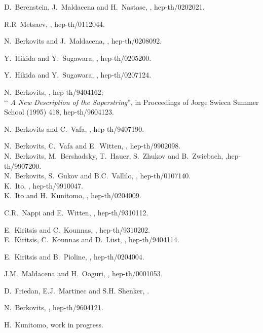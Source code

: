 \documentclass[a4paper,seceq,preprint]{ptptex}
\begin{document}
\begin{thebibliography}{99}
D.~Berenstein, J.~Maldacena and H.~Nastase, , 
hep-th/0202021.

R.R~Metsaev, , hep-th/0112044. 

N.~Berkovits and J.~Maldacena, , hep-th/0208092. 

Y.~Hikida and Y.~Sugawara, , hep-th/0205200.

Y.~Hikida and Y.~Sugawara, , hep-th/0207124.

N.~Berkovits, , hep-th/9404162;\\
  \lq\lq\textsl{ A New Description of the Superstring}'', 
in Proceedings of Jorge Swieca Summer School (1995) 418, hep-th/9604123.

N.~Berkovits and C.~Vafa, , hep-th/9407190.

N.~Berkovits, C.~Vafa and E.~Witten, ,
hep-th/9902098.\\
N.~Berkovits, M.~Bershadsky, T.~Hauer, S.~Zhukov and B.~Zwiebach,
,hep-th/9907200.\\
N.~Berkovits, S.~Gukov and B.C.~Vallilo, , 
hep-th/0107140.\\
K.~Ito, , hep-th/9910047.\\
K.~Ito and H.~Kunitomo, , hep-th/0204009.

C.R.~Nappi and E.~Witten, , hep-th/9310112.

E.~Kiritsis and C.~Kounnas, , hep-th/9310202.\\
E.~Kiritsis, C.~Kounnas and D.~L\"ust, ,
hep-th/9404114.

E.~Kiritsis and B.~Pioline, , hep-th/0204004.

J.M.~Maldacena and H.~Ooguri, , hep-th/0001053.

D.~Friedan, E.J.~Martinec and S.H. Shenker, .

N.~Berkovits, , hep-th/9604121.

H.~Kunitomo, work in progress.

\end{thebibliography}
\end{document}
